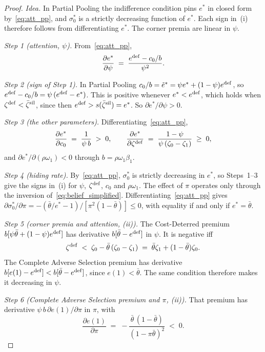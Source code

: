 \begin{proof}\upshape
\emph{Idea.} In Partial Pooling the indifference condition pins $e^*$ in closed form by~\eqref{eq:att_pp}, and $\sigma_0^*$ is a strictly decreasing function of $e^*$. Each sign in~(i) therefore follows from differentiating $e^*$. The corner premia are linear in $\psi$.

\emph{Step 1 (attention, $\psi$).} From~\eqref{eq:att_pp},
\begin{equation*}
    \frac{\partial e^*}{\partial\psi}\;=\;\frac{e^{\rm def}-c_0/b}{\psi^2}.
\end{equation*}

\emph{Step 2 (sign of Step 1).} In Partial Pooling $c_0/b=\tilde e^*=\psi e^*+(1-\psi)e^{\rm def}$, so $e^{\rm def}-c_0/b=\psi\,(e^{\rm def}-e^*)$. This is positive whenever $e^*<e^{\rm def}$, which holds when $\zeta^{\rm def}<\bar \zeta^{\rm sil}$, since then $e^{\rm def}>s(\bar \zeta^{\rm sil})=e^*$. So $\partial e^*/\partial\psi>0$.

\emph{Step 3 (the other parameters).} Differentiating~\eqref{eq:att_pp},
\begin{equation*}
    \frac{\partial e^*}{\partial c_0}\;=\;\frac{1}{\psi\,b}\;>\;0,\qquad
    \frac{\partial e^*}{\partial \zeta^{\rm def}}\;=\;\frac{1-\psi}{\psi\,(\zeta_0-\zeta_1)}\;\ge\;0,
\end{equation*}
and $\partial e^*/\partial(\rho\omega_1)<0$ through $b=\rho\omega_1\beta_1$.

\emph{Step 4 (hiding rate).} By~\eqref{eq:att_pp}, $\sigma_0^*$ is strictly decreasing in $e^*$, so Steps~1--3 give the signs in~(i) for $\psi$, $\zeta^{\rm def}$, $c_0$ and $\rho\omega_1$. The effect of $\pi$ operates only through the inversion of~\eqref{eq:belief_simplified}. Differentiating~\eqref{eq:att_pp} gives $\partial\sigma_0^*/\partial\pi=-(\bar\theta/e^*-1)/[\pi^2(1-\bar\theta)]\le0$, with equality if and only if $e^*=\bar\theta$.

\emph{Step 5 (corner premia and attention, (ii)).} The Cost-Deterred premium $b[\psi\bar\theta+(1-\psi)e^{\rm def}]$ has derivative $b[\bar\theta-e^{\rm def}]$ in $\psi$. It is negative iff
\begin{equation*}
    \zeta^{\rm def}\;<\;\zeta_0-\bar\theta\,(\zeta_0-\zeta_1)\;=\;\bar\theta \zeta_1+(1-\bar\theta)\zeta_0 .
\end{equation*}
The Complete Adverse Selection premium has derivative $b[e(1)-e^{\rm def}]<b[\bar\theta-e^{\rm def}]$, since $e(1)<\bar\theta$. The same condition therefore makes it decreasing in $\psi$.

\emph{Step 6 (Complete Adverse Selection premium and $\pi$, (ii)).} That premium has derivative $\psi\,b\,\partial e(1)/\partial\pi$ in $\pi$, with
\begin{equation*}
    \frac{\partial e(1)}{\partial\pi}\;=\;-\frac{\bar\theta\,(1-\bar\theta)}{(1-\pi\bar\theta)^2}\;<\;0 .
\end{equation*}
\end{proof}

